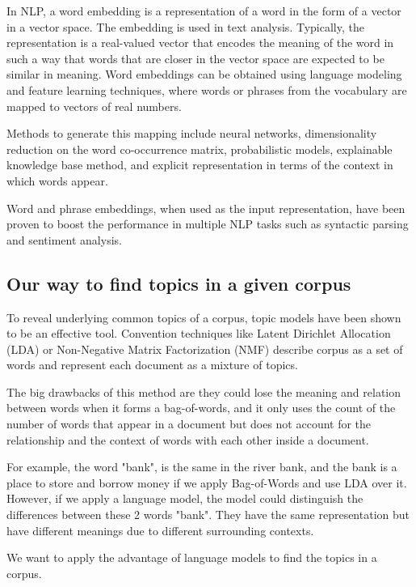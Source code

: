 In NLP, a word embedding is a representation of a word in the form of a vector in a vector space. The embedding is used in text analysis. Typically, the representation is a real-valued vector that encodes the meaning of the word in such a way that words that are closer in the vector space are expected to be similar in meaning. Word embeddings can be obtained using language modeling and feature learning techniques, where words or phrases from the vocabulary are mapped to vectors of real numbers.

Methods to generate this mapping include neural networks, dimensionality reduction on the word co-occurrence matrix, probabilistic models, explainable knowledge base method, and explicit representation in terms of the context in which words appear.

Word and phrase embeddings, when used as the input representation, have been proven to boost the performance in multiple NLP tasks such as syntactic parsing and sentiment analysis.

\subsection{Our way to find topics in a given corpus}

To reveal underlying common topics of a corpus, topic models have been shown to be an effective tool. Convention techniques like Latent Dirichlet Allocation (LDA)\cite{944937} or Non-Negative Matrix Factorization (NMF)\cite{conf/nips/LeeS00} describe corpus as a set of words and represent each document as a mixture of topics.

The big drawbacks of this method are they could lose the meaning and relation between words when it forms a bag-of-words, and it only uses the count of the number of words that appear in a document but does not account for the relationship and the context of words with each other inside a document.

For example, the word "bank", is the same in the river bank, and the bank is a place to store and borrow money if we apply Bag-of-Words\cite{bagofwords} and use LDA over it. However, if we apply a language model, the model could distinguish the differences between these 2 words "bank". They have the same representation but have different meanings due to different surrounding contexts.

We want to apply the advantage of language models to find the topics in a corpus.



